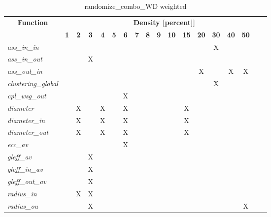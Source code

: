 \begin{table}[h] \centering \begin{tabular}{|l|c|c|c|c|c|c|c|c|c|c|c|c|c|c|c|} \hline\multicolumn{1}{|c|}{\textbf{\large{Function}}} & \multicolumn{17}{c|}{\large{\textbf{Density [percent]]}}}\\\cline{2-18}  & \textbf{1} &  \textbf{2} &  \textbf{3} &  \textbf{4} &  \textbf{5} &  \textbf{6} &  \textbf{7} &  \textbf{8} &  \textbf{9} &  \textbf{10} &  \textbf{15} &  \textbf{20} &  \textbf{30} &  \textbf{40} &  \textbf{50} \\ \hline   \textit{ass\_in\_in} &   &   &   &   &   &   &   &   &   &   &   &   & X &   &   \\ \hline  \textit{ass\_in\_out} &   &   & X &   &   &   &   &   &   &   &   &   &   &   &   \\ \hline  \textit{ass\_out\_in} &   &   &   &   &   &   &   &   &   &   &   & X &   & X & X \\ \hline  \textit{clustering\_global} &   &   &   &   &   &   &   &   &   &   &   &   & X &   &   \\ \hline  \textit{cpl\_wsg\_out} &   &   &   &   &   & X &   &   &   &   &   &   &   &   &   \\ \hline  \textit{diameter} &   & X &   & X &   & X &   &   &   &   & X &   &   &   &   \\ \hline  \textit{diameter\_in} &   & X &   & X &   & X &   &   &   &   & X &   &   &   &   \\ \hline  \textit{diameter\_out} &   & X &   & X &   & X &   &   &   &   & X &   &   &   &   \\ \hline  \textit{ecc\_av} &   &   &   &   &   & X &   &   &   &   &   &   &   &   &   \\ \hline  \textit{gleff\_av} &   &   & X &   &   &   &   &   &   &   &   &   &   &   &   \\ \hline  \textit{gleff\_in\_av} &   &   & X &   &   &   &   &   &   &   &   &   &   &   &   \\ \hline  \textit{gleff\_out\_av} &   &   & X &   &   &   &   &   &   &   &   &   &   &   &   \\ \hline  \textit{radius\_in} &   & X & X &   &   &   &   &   &   &   &   &   &   &   &   \\ \hline  \textit{radius\_ou} &   &   & X &   &   &   &   &   &   &   &   &   &   &   & X \\ \hline \end{tabular}\caption{randomize\_combo\_WD weighted}\label{tab:my_label} \end{table}